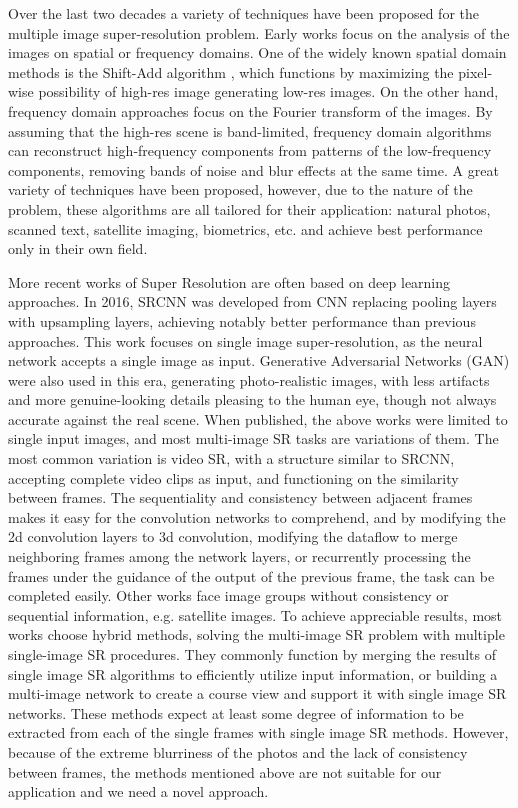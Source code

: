 Over the last two decades a variety of techniques have been proposed for the multiple image super-resolution problem. Early works focus on the analysis of the images on spatial or frequency domains. One of the widely known spatial domain methods is the Shift-Add algorithm \cite{farsiu2003robust}, which functions by maximizing the pixel-wise possibility of high-res image generating low-res images. On the other hand, frequency domain approaches focus on the Fourier transform of the images. By assuming that the high-res scene is band-limited, frequency domain algorithms can reconstruct high-frequency components from patterns of the low-frequency components, removing bands of noise and blur effects at the same time. A great variety of techniques have been proposed, however, due to the nature of the problem, these algorithms are all tailored for their application: natural photos, scanned text, satellite imaging, biometrics, etc. and achieve best performance only in their own field.

More recent works of Super Resolution are often based on deep learning approaches. In 2016, SRCNN \cite{dong2015image} was developed from CNN replacing pooling layers with upsampling layers, achieving notably better performance than previous approaches. This work focuses on single image super-resolution, as the neural network accepts a single image as input. Generative Adversarial Networks (GAN) were also used in this era\cite{ledig2017photo}, generating photo-realistic images, with less artifacts and more genuine-looking details pleasing to the human eye, though not always accurate against the real scene. When published, the above works were limited to single input images, and most multi-image SR tasks are variations of them. The most common variation is video SR\cite{shi2016real, kappeler2016video}, with a structure similar to SRCNN, accepting complete video clips as input, and functioning on the similarity between frames. The sequentiality and consistency between adjacent frames makes it easy for the convolution networks to comprehend, and by modifying the 2d convolution layers to 3d convolution\cite{caballero2017real}, modifying the dataflow to merge neighboring frames among the network layers\cite{huang2017video}, or recurrently processing the frames under the guidance of the output of the previous frame\cite{sajjadi2018frame}, the task can be completed easily. Other works face image groups without consistency or sequential information, e.g. satellite images. To achieve appreciable results, most works choose hybrid methods, solving the multi-image SR problem with multiple single-image SR procedures. They commonly function by merging the results of single image SR algorithms to efficiently utilize input information\cite{kawulok2019deep}, or building a multi-image network to create a course view and support it with single image SR networks\cite{8834937}. These methods expect at least some degree of information to be extracted from each of the single frames with single image SR methods. However, because of the extreme blurriness of the photos and the lack of consistency between frames, the methods mentioned above are not suitable for our application and we need a novel approach.